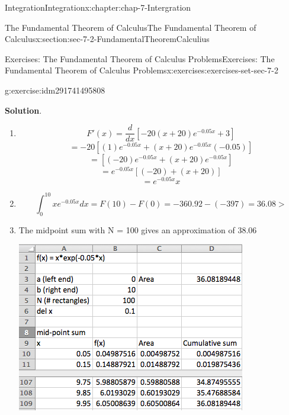 \documentclass[oneside,10pt,]{book}
\numberwithin{equation}{section}
\begin{document}
\begin{chapterptx}{Integration}{}{Integration}{}{}{x:chapter:chap-7-Intergration}
\begin{sectionptx}{The Fundamental Theorem of Calculus}{}{The Fundamental Theorem of Calculus}{}{}{x:section:sec-7-2-FundamentalTheoremCalculius}
\begin{exercises-subsection}{Exercises: The Fundamental Theorem of Calculus Problems}{}{Exercises: The Fundamental Theorem of Calculus Problems}{}{}{x:exercises:exercises-set-sec-7-2}
\begin{divisionexercise}{5}{}{}{g:exercise:idm291741495808}
\begin{enumerate}[label=(\alph*)]
\end{enumerate}
\par\smallskip%
\noindent\textbf{Solution}.\hypertarget{g:solution:idm291741490144}{}\quad{}%
\begin{enumerate}[label=(\alph*)]
\item{}%
\begin{equation*}
F'(x)=\frac{d}{dx}  [-20(x+20)  e^{-0.05x}+3]
\end{equation*}
%
\begin{equation*}
=-20 [(1)  e^{-0.05x}+(x+20)  e^{-0.05x} (-0.05)] 
\end{equation*}
%
\begin{equation*}
= [(-20)  e^{-0.05x}+(x+20)  e^{-0.05x}]    
\end{equation*}
%
\begin{equation*}
=e^{-0.05x}  [(-20)+(x+20)] 
\end{equation*}
%
\begin{equation*}
=e^{-0.05x} x 
\end{equation*}
%
\item{}%
\begin{equation*}
\int_0^{10}x e^{-0.05 x} dx=F(10)-F(0)=-360.92-(-397)=36.08>
\end{equation*}
%
\item{}The midpoint sum with N = 100 gives an approximation of 38.06%
\begin{sidebyside}{1}{0.25}{0.25}{0}%
\begin{sbspanel}{0.5}%
\includegraphics[width=\linewidth]{images/sec7-2-sol5a.png}
\end{sbspanel}%
\end{sidebyside}%

\end{enumerate}
\end{divisionexercise}
\end{exercises-subsection}
\end{sectionptx}
\end{chapterptx}
\end{document}
